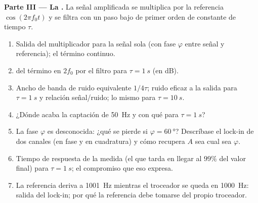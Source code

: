 \begin{problem}
\medskip
\noindent\textbf{Parte III --- La .}
La señal amplificada se multiplica por la referencia $\cos(2\pi f_0t)$ y se
filtra con un paso bajo de primer orden de constante de tiempo $\tau$.
\begin{enumerate}[resume]
  \item Salida del multiplicador para la señal sola (con fase $\varphi$
        entre señal y referencia); el término continuo.
  \item {} del término en $2f_0$ por el filtro para $\tau = \qty{1}{s}$
        (en dB).
  \item Ancho de banda de ruido equivalente $1/4\tau$; ruido eficaz a la
        salida para $\tau = \qty{1}{s}$ y relación señal/ruido; lo mismo
        para $\tau = \qty{10}{s}$.
  \item ¿Dónde acaba la captación de \qty{50}{Hz} y con qué 
        para $\tau = \qty{1}{s}$?
  \item La fase $\varphi$ es desconocida: ¿qué se pierde si $\varphi = \qty{60}{\degree}$?
        Descríbase el lock-in de dos canales (en fase y en cuadratura) y
        cómo recupera $A$ sea cual sea $\varphi$.
  \item Tiempo de respuesta de la medida (el que tarda en llegar al $99\%$
        del valor final) para $\tau = \qty{1}{s}$; el compromiso que eso
        expresa.
  \item La referencia deriva a \qty{1001}{Hz} mientras el troceador se
        queda en \qty{1000}{Hz}: salida del lock-in; por qué la referencia
        debe tomarse del propio troceador.
\end{enumerate}


\end{problem}
